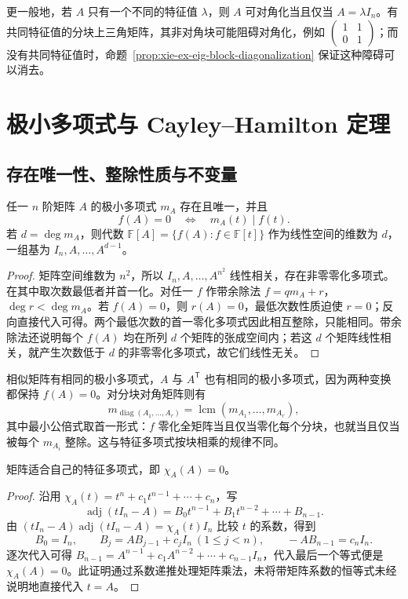 更一般地，若 $A$ 只有一个不同的特征值 $\lambda$，则 $A$ 可对角化当且仅当 $A=\lambda I_n$。有共同特征值的分块上三角矩阵，其非对角块可能阻碍对角化，例如 $\begin{pmatrix}1&1\\0&1\end{pmatrix}$；而没有共同特征值时，命题~\ref{prop:xie-ex-eig-block-diagonalization} 保证这种障碍可以消去。

\section{极小多项式与 Cayley--Hamilton 定理}
\label{sec:xie-ex-eig-minimal-polynomial}

\subsection{存在唯一性、整除性质与不变量}

\begin{theorem}
\label{thm:xie-ex-eig-minimal-properties}
任一 $n$ 阶矩阵 $A$ 的极小多项式 $m_A$ 存在且唯一，并且
\[
f(A)=0\quad\Longleftrightarrow\quad m_A(t)\mid f(t).
\]
若 $d=\deg m_A$，则代数 $\mathbb F[A]=\{f(A):f\in\mathbb F[t]\}$ 作为线性空间的维数为 $d$，一组基为 $I_n,A,\ldots,A^{d-1}$。
\end{theorem}
\begin{proof}
矩阵空间维数为 $n^2$，所以 $I_n,A,\ldots,A^{n^2}$ 线性相关，存在非零零化多项式。在其中取次数最低者并首一化。对任一 $f$ 作带余除法 $f=qm_A+r$，$\deg r<\deg m_A$。若 $f(A)=0$，则 $r(A)=0$，最低次数性质迫使 $r=0$；反向直接代入可得。两个最低次数的首一零化多项式因此相互整除，只能相同。带余除法还说明每个 $f(A)$ 均在所列 $d$ 个矩阵的张成空间内；若这 $d$ 个矩阵线性相关，就产生次数低于 $d$ 的非零零化多项式，故它们线性无关。
\end{proof}

相似矩阵有相同的极小多项式，$A$ 与 $A^{\mathsf T}$ 也有相同的极小多项式，因为两种变换都保持 $f(A)=0$。对分块对角矩阵则有
\begin{equation}
m_{\operatorname{diag}(A_1,\ldots,A_r)}
=\operatorname{lcm}(m_{A_1},\ldots,m_{A_r}),
\label{eq:xie-ex-eig-block-minimal}
\end{equation}
其中最小公倍式取首一形式：$f$ 零化全矩阵当且仅当零化每个分块，也就当且仅当被每个 $m_{A_i}$ 整除。这与特征多项式按块相乘的规律不同。

\begin{theorem}
\label{thm:xie-ex-eig-cayley-hamilton}
矩阵适合自己的特征多项式，即 $\chi_A(A)=0$。
\end{theorem}
\begin{proof}
沿用 $\chi_A(t)=t^n+c_1t^{n-1}+\cdots+c_n$，写
\[
\operatorname{adj}(tI_n-A)=B_0t^{n-1}+B_1t^{n-2}+\cdots+B_{n-1}.
\]
由 $(tI_n-A)\operatorname{adj}(tI_n-A)=\chi_A(t)I_n$ 比较 $t$ 的系数，得到
\[
B_0=I_n,\qquad B_j=AB_{j-1}+c_jI_n\ (1\le j<n),\qquad
-AB_{n-1}=c_nI_n.
\]
逐次代入可得 $B_{n-1}=A^{n-1}+c_1A^{n-2}+\cdots+c_{n-1}I_n$，代入最后一个等式便是 $\chi_A(A)=0$。此证明通过系数递推处理矩阵乘法，未将带矩阵系数的恒等式未经说明地直接代入 $t=A$。
\end{proof}


